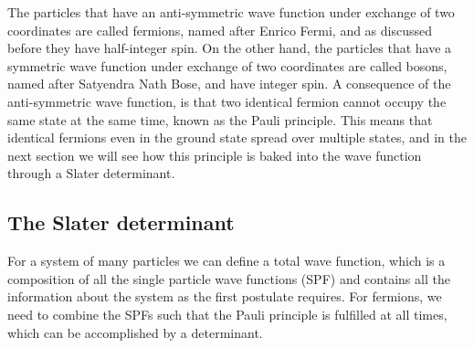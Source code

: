 The particles that have an anti-symmetric wave function under exchange of two coordinates are called fermions, named after Enrico Fermi, and as discussed before they have half-integer spin. On the other hand, the particles that have a symmetric wave function under exchange of two coordinates are called bosons, named after Satyendra Nath Bose, and have integer spin. A consequence of the anti-symmetric wave function, is that two identical fermion cannot occupy the same state at the same time, known as the Pauli principle. This means that identical fermions even in the ground state spread over multiple states, and in the next section we will see how this principle is baked into the wave function through a Slater determinant. 

\subsection{The Slater determinant} \label{sec:slater}
For a system of many particles we can define a total wave function, which is a composition of all the single particle wave functions (SPF) and contains all the information about the system as the first postulate requires. For fermions, we need to combine the SPFs such that the Pauli principle is fulfilled at all times, which can be accomplished by a determinant. 

